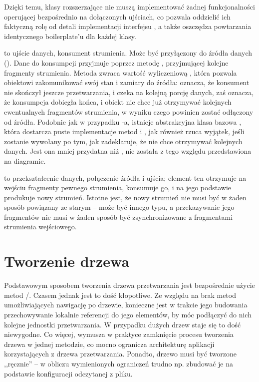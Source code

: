 Dzięki temu, klasy rozszerzające  nie muszą implementować żadnej
funkcjonalności operującej bezpośrednio na dołączonych ujściach, co pozwala oddzielić ich faktyczną
rolę od detali implementacji interfejsu , a także oszczędza powtarzania
identycznego boilerplate'u dla każdej klasy.

 to ujście danych, konsument strumienia. Może być przyłączony do źródła danych
(). Dane do konsumpcji przyjmuje poprzez metodę , przyjmującej kolejne
fragmenty strumienia. Metoda  zwraca wartość wyliczeniową , która pozwala
obiektowi zakomunikować swój stan i zamiary do źródła:  oznacza, że konsument nie
skończył jeszcze przetwarzania, i czeka na kolejną porcję danych, zaś  oznacza, że
konsumpcja dobiegła końca, i obiekt nie chce już otrzymywać kolejnych ewentualnych fragmentów
strumienia, w wyniku czego powinien zostać odłączony od źródła. Podobnie jak w przypadku
-a, istnieje abstrakcyjna klasa bazowa , która dostarcza
puste implementacje metod  i , jak również rzuca wyjątek, jeśli
 zostanie wywołany po tym, jak  zadeklaruje, że nie chce otrzymywać
kolejnych danych. Jest ona mniej przydatna niż , nie została z tego względu
przedstawiona na diagramie.

 to przekształcenie danych, połączenie źródła i ujścia; element ten otrzymuje na
wejściu fragmenty pewnego strumienia, konsumuje go, i na jego podstawie produkuje nowy strumień.
Istotne jest, że nowy strumień nie musi być w żaden sposób powiązany ze starym -- może być innego
typu, a przekazywanie jego fragmentów nie musi w żaden sposób być zsynchronizowane z fragmentami
strumienia wejściowego. 


\section{Tworzenie drzewa}

Podstawowym sposobem tworzenia drzewa przetwarzania jest bezpośrednie użycie metod
\slash {}. Czasem jednak jest to dość kłopotliwe. Ze względu na brak
metod umożliwiających nawigację po drzewie, konieczne jest w trakcie jego budowania przechowywanie
lokalnie referencji do jego elementów, by móc podłączyć do nich kolejne jednostki przetwarzania. W
przypadku dużych drzew staje się to dość niewygodne. Co więcej, wymusza w praktyce zamknięcie
procesu tworzenia drzewa w jednej metodzie, co mocno ogranicza architekturę aplikacji korzystających
z drzewa przetwarzania. Ponadto, drzewo musi być tworzone ,,ręcznie'' -- w obliczu wymienionych
ograniczeń trudno np. zbudować je na podstawie konfiguracji odczytanej z pliku. 

